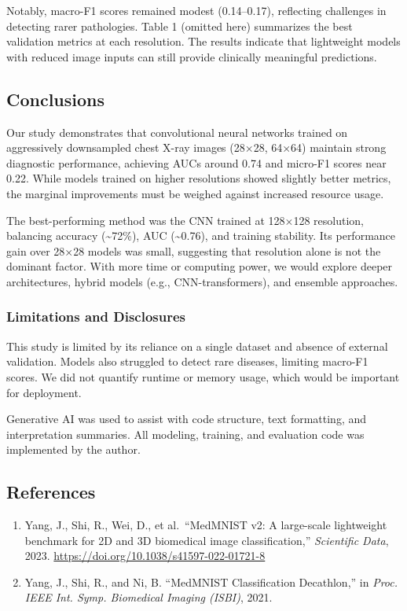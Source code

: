 \documentclass[
]{article}
\providecommand{\tightlist}{%
  \setlength{\itemsep}{0pt}\setlength{\parskip}{0pt}}
\begin{document}
Notably, macro-F1 scores remained modest (0.14--0.17), reflecting
challenges in detecting rarer pathologies. Table 1 (omitted here)
summarizes the best validation metrics at each resolution. The results
indicate that lightweight models with reduced image inputs can still
provide clinically meaningful predictions.

\subsection{Conclusions}\label{conclusions}

Our study demonstrates that convolutional neural networks trained on
aggressively downsampled chest X-ray images (28×28, 64×64) maintain
strong diagnostic performance, achieving AUCs around 0.74 and micro-F1
scores near 0.22. While models trained on higher resolutions showed
slightly better metrics, the marginal improvements must be weighed
against increased resource usage.

The best-performing method was the CNN trained at 128×128 resolution,
balancing accuracy (\textasciitilde72\%), AUC (\textasciitilde0.76), and
training stability. Its performance gain over 28×28 models was small,
suggesting that resolution alone is not the dominant factor. With more
time or computing power, we would explore deeper architectures, hybrid
models (e.g., CNN-transformers), and ensemble approaches.

\subsubsection{Limitations and
Disclosures}\label{limitations-and-disclosures}

This study is limited by its reliance on a single dataset and absence of
external validation. Models also struggled to detect rare diseases,
limiting macro-F1 scores. We did not quantify runtime or memory usage,
which would be important for deployment.

Generative AI was used to assist with code structure, text formatting,
and interpretation summaries. All modeling, training, and evaluation
code was implemented by the author.

\subsection{References}\label{references}

\begin{enumerate}
\def\labelenumi{\arabic{enumi}.}
\tightlist
\item
  Yang, J., Shi, R., Wei, D., et al.~``MedMNIST v2: A large-scale
  lightweight benchmark for 2D and 3D biomedical image classification,''
  \emph{Scientific Data}, 2023.
  \url{https://doi.org/10.1038/s41597-022-01721-8}\\
\item
  Yang, J., Shi, R., and Ni, B. ``MedMNIST Classification Decathlon,''
  in \emph{Proc. IEEE Int. Symp. Biomedical Imaging (ISBI)}, 2021.
\end{enumerate}
\end{document}

